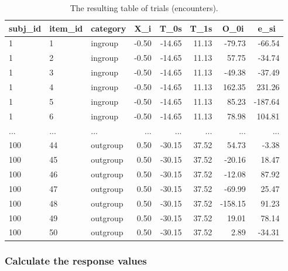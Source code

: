 \documentclass[
  english,
  doc,floatsintext]{apa6}
\begin{document}
\begin{table}[H]

\begin{center}
\begin{threeparttable}

\caption{\label{tab:trials-table}The resulting table of trials (encounters).}

\begin{tabular}{lllrrrrr}
\toprule
subj\_id & \multicolumn{1}{c}{item\_id} & \multicolumn{1}{c}{category} & \multicolumn{1}{c}{X\_i} & \multicolumn{1}{c}{T\_0s} & \multicolumn{1}{c}{T\_1s} & \multicolumn{1}{c}{O\_0i} & \multicolumn{1}{c}{e\_si}\\
\midrule
1 & 1 & ingroup & -0.50 & -14.65 & 11.13 & -79.73 & -66.54\\
1 & 2 & ingroup & -0.50 & -14.65 & 11.13 & 57.75 & -34.74\\
1 & 3 & ingroup & -0.50 & -14.65 & 11.13 & -49.38 & -37.49\\
1 & 4 & ingroup & -0.50 & -14.65 & 11.13 & 162.35 & 231.26\\
1 & 5 & ingroup & -0.50 & -14.65 & 11.13 & 85.23 & -187.64\\
1 & 6 & ingroup & -0.50 & -14.65 & 11.13 & 78.98 & 104.81\\
... & ... & ... & ... & ... & ... & ... & ...\\
100 & 44 & outgroup & 0.50 & -30.15 & 37.52 & 54.73 & -3.38\\
100 & 45 & outgroup & 0.50 & -30.15 & 37.52 & -20.16 & 18.47\\
100 & 46 & outgroup & 0.50 & -30.15 & 37.52 & -12.08 & 87.92\\
100 & 47 & outgroup & 0.50 & -30.15 & 37.52 & -69.99 & 25.47\\
100 & 48 & outgroup & 0.50 & -30.15 & 37.52 & -158.15 & 91.23\\
100 & 49 & outgroup & 0.50 & -30.15 & 37.52 & 19.01 & 78.14\\
100 & 50 & outgroup & 0.50 & -30.15 & 37.52 & 2.89 & -34.31\\
\bottomrule
\end{tabular}

\end{threeparttable}
\end{center}

\end{table}

\hypertarget{calculate-the-response-values}{%
\subsubsection{Calculate the response values}\label{calculate-the-response-values}}
\end{document}
